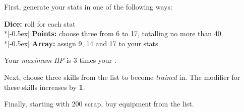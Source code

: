 
First, generate your stats in one of the following ways:

\textbf{Dice:} roll  for each stat \\*[-0.5ex]
\textbf{Points:} choose three from 6 to 17, totalling no more than 40 \\*[-0.5ex]
\textbf{Array:} assign 9, 14 and 17 to your stats

Your \emph{maximum HP} is 3 times your .

Next, choose three skills from the list to become \emph{trained} in. The modifier for these skills increases by \textbf{1}.

Finally, starting with 200 scrap, buy equipment from the list.
